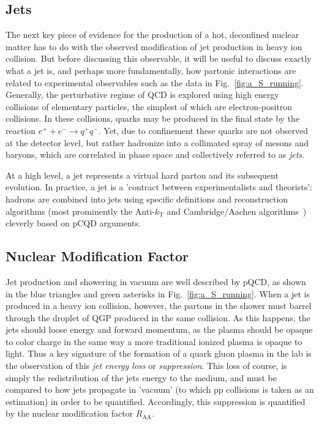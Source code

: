\subsection{Jets}
The next key piece of evidence for the production of a hot, deconfined nuclear matter has to do with the observed modification of jet production in heavy ion collision. But before discussing this observable, it will be useful to discuss exactly what a jet is, and perhaps more fundamentally, how partonic interactions are related to experimental observables such as the data in Fig.~\ref{fig:a_S_running}. Generally, the perturbative regime of QCD is explored using high energy collisions of elementary particles, the simplest of which are electron-positron collisions. In these collisions, quarks may be produced in the final state by the reaction $e^++e^- \rightarrow q^+q^-$. Yet, due to confinement these quarks are not observed at the detector level, but rather hadronize into a collimated spray of mesons and baryons, which are correlated in phase space and collectively referred to as \textit{jets}. 

At a high level, a jet represents a virtual hard parton and its subsequent evolution. In practice, a jet is a 'contract between experimentalists and theorists': hadrons are combined into jets using specific definitions and reconstruction algorithms (most prominently the Anti-$k_\mathrm{T}$ and Cambridge/Aachen algorithms~\cite{Atkin2015}) cleverly based on pCQD arguments. 

\subsection{Nuclear Modification Factor}
\label{sec:raa}
Jet production and showering in vacuum are well described by pQCD, as shown in the blue triangles and green asterisks in Fig.~\ref{fig:a_S_running}. When a jet is produced in a heavy ion collision, however, the partons in the shower must barrel through the droplet of QGP produced in the same collision. As this happens, the jets should loose energy and forward momentum, as the plasma should be opaque to color charge in the same way a more traditional ionized plasma is opaque to light.  Thus a key signature of the formation of a quark gluon plasma in the lab is the observation of this \textit{jet energy loss} or \textit{suppression}. This loss of course, is simply the redistribution of the jets energy to the medium, and must be compared to how jets propagate in 'vacuum' (to which pp collisions is taken as an estimation) in order to be quantified. Accordingly, this suppression is quantified by the nuclear modification factor $R_\mathrm{AA}$. 

